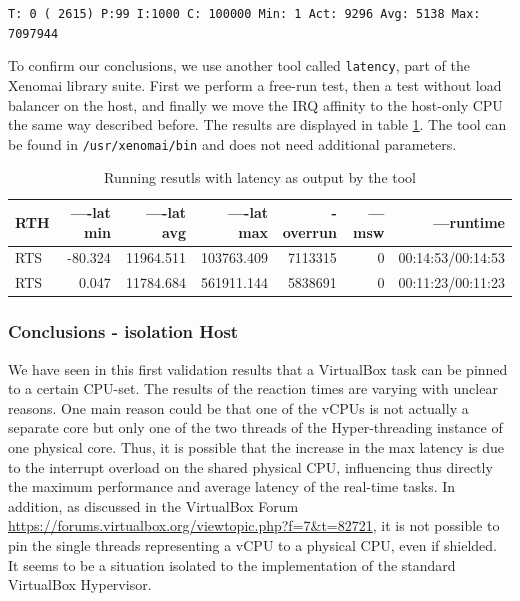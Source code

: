 \documentclass[]{scrartcl}
\begin{document}
\noindent \small \texttt{T: 0 ( 2615) P:99 I:1000 C: 100000 Min: 1 Act: 9296 Avg: 5138 Max:  7097944}

To confirm our conclusions, we use another tool called \texttt{latency}, part of the Xenomai library suite. First we perform a free-run test, then a test without load balancer on the host, and finally we move the IRQ affinity to the host-only CPU the same way described before. The results are displayed in table \ref{tab:latency}. The tool can be found in \texttt{/usr/xenomai/bin} and does not need additional parameters.

\begin{table}[h]
	\begin{tabular}{l|r|r| r|r |r | r }
		RTH&----lat min&----lat avg&----lat max&-overrun&---msw&---runtime\\
		\hline
		RTS&    -80.324&  11964.511& 103763.409& 7113315&     0&    00:14:53/00:14:53\\
		RTS&      0.047&  11784.684& 561911.144& 5838691&     0&    00:11:23/00:11:23\\
	\end{tabular}
	\caption{Running resutls with latency as output by the tool}
	\label{tab:latency}
\end{table}



\subsubsection{Conclusions - isolation Host}
\label{sec:conciso}

We have seen in this first validation results that a VirtualBox task can be pinned to a certain CPU-set. The results of the reaction times are varying with unclear reasons. 
One main reason could be that one of the vCPUs is not actually a separate core but only one of the two threads of the Hyper-threading instance of one physical core. 
Thus, it is possible that the increase in the max latency is due to the interrupt overload on the shared physical CPU, influencing thus directly the maximum performance and average latency of the real-time tasks. In addition, as discussed in the VirtualBox Forum \url{https://forums.virtualbox.org/viewtopic.php?f=7&t=82721}, it is not possible to pin the single threads representing a vCPU to a physical CPU, even if shielded. It seems to be a situation isolated to the implementation of the standard VirtualBox Hypervisor. 
\end{document}
